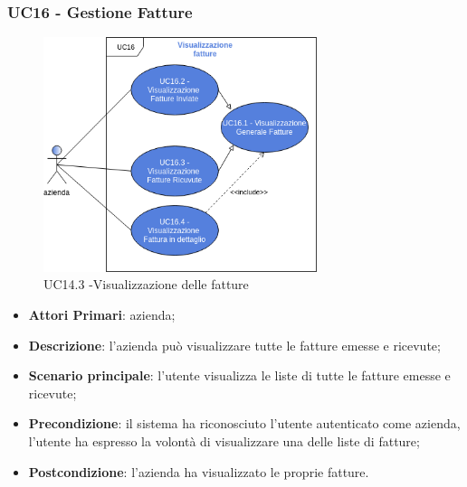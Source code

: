 \subsubsection{UC16 - Gestione Fatture}
\begin{figure}[h]
	\includegraphics[width=8cm]{res/images/UC16-Generale.png}
	\centering
	\caption{UC14.3 -Visualizzazione delle fatture}
\end{figure}
\begin{itemize}
	\item \textbf{Attori Primari}: azienda;
	\item \textbf{Descrizione}: l'azienda può visualizzare tutte le fatture emesse e ricevute;
	\item \textbf{Scenario principale}: l'utente visualizza le liste di tutte le fatture emesse e ricevute;
	\item \textbf{Precondizione}: il sistema ha riconosciuto l'utente autenticato come azienda, l'utente ha espresso la volontà di visualizzare una delle liste di fatture;
	\item \textbf{Postcondizione}: l'azienda ha visualizzato le proprie fatture.
\end{itemize}
